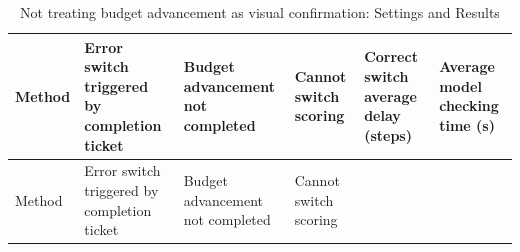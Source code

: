 \FloatBarrier\begingroup\small\setlength{\tabcolsep}{2.5pt}
\begin{longtable}[]{@{}
  >{\raggedright\arraybackslash}p{}
  >{\raggedright\arraybackslash}p{}
  >{\raggedright\arraybackslash}p{}
  >{\raggedright\arraybackslash}p{}
  >{\raggedright\arraybackslash}p{}
  >{\raggedright\arraybackslash}p{}@{}}
\caption{Not treating budget advancement as visual confirmation: Settings and Results}\label{tab:s12-8}\tabularnewline
\toprule\noalign{}
\begin{minipage}[b]{\linewidth}\raggedright
Method
\end{minipage} & \begin{minipage}[b]{\linewidth}\raggedright
Error switch triggered by completion ticket
\end{minipage} & \begin{minipage}[b]{\linewidth}\raggedright
Budget advancement not completed
\end{minipage} & \begin{minipage}[b]{\linewidth}\raggedright
Cannot switch scoring
\end{minipage} & \begin{minipage}[b]{\linewidth}\raggedright
Correct switch average delay (steps)
\end{minipage} & \begin{minipage}[b]{\linewidth}\raggedright
Average model checking time (s)
\end{minipage} \\
\midrule\noalign{}
\endfirsthead
\toprule\noalign{}
\begin{minipage}[b]{\linewidth}\raggedright
Method
\end{minipage} & \begin{minipage}[b]{\linewidth}\raggedright
Error switch triggered by completion ticket
\end{minipage} & \begin{minipage}[b]{\linewidth}\raggedright
Budget advancement not completed
\end{minipage} & \begin{minipage}[b]{\linewidth}\raggedright
Cannot switch scoring
\end{minipage} & \begin{minipage}[b]{\linewidth}\raggedright

\end{minipage}
\end{longtable}
